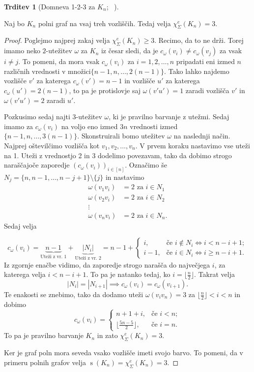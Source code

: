 \documentclass[12pt,a4paper,twoside]{article}
\theoremstyle{definition} %
\theoremstyle{plain} %
\newtheorem{trditev}[definicija]{Trditev}
\newcommand{\ec}{\chi_{\Sigma}^e}
\numberwithin{equation}{section}  %
\DeclareMathOperator{\s}{s}
\begin{document}
\begin{trditev}[Domneva 1-2-3 za $K_n$;~\citet{examples} ]
\end{trditev}
\label{res_complete}
Naj bo $K_n$ polni graf na vsaj treh vozliščih. Tedaj velja $\ec(K_n) = 3$.
	\begin{proof}


Poglejmo najprej zakaj velja $\ec(K_n) \ge 3$. Recimo, da to ne drži. Torej imamo neko $2$-utežitev $\omega$ za $K_n$ iz česar sledi, da je $c_{\omega}(v_i) \neq c_{\omega}(v_j)$ za vsak $ i \neq j$. To pomeni, da mora vsak $c_{\omega}(v_i)$ za $i=1,2,\ldots,n$ pripadati eni izmed $n$ različnih vrednosti v množici$\{n-1, n, \ldots, 2(n-1)\}$. Tako lahko najdemo vozlišče $v'$ za katerega $c_{\omega}(v') = n-1$ in vozlišče $u'$ za katerega $c_{\omega}(u') = 2(n-1)$, to pa je protislovje saj $\omega(v'u') = 1$ zaradi vozlišča $v'$ in $\omega(v'u') = 2$ zaradi $u'$.

 Pozkusimo sedaj najti $3$-utežitev $\omega$, ki je pravilno barvanje z utežmi. Sedaj imamo za $c_{\omega}(v_i)$ na voljo eno izmed $3n$ vrednosti izmed $\{n-1, n, \ldots, 3(n-1)\}$. Skonstruirali bomo utežitev $\omega$ na naslednji način. Najprej oštevilčimo vozlišča kot $v_1, v_2, \ldots, v_n$. V prvem koraku nastavimo vse uteži na 1. Uteži z vrednostjo 2 in 3 dodelimo povezavam, tako da dobimo strogo naraščajoče zaporedje $\left(c_{\omega}(v_i)\right)_{i \in [n]}$. Označimo še $N_j = \{n, n-1, \ldots, n - j + 1\} \setminus \{j\}$ in nastavimo
 \begin{equation*}
 \begin{split}
 \omega(v_1 v_i) &= 2 \text{ za } i \in N_1 \\
 \omega(v_2v_i) &=2 \text{ za } i \in N_2\\
 \vdots \\
 \omega(v_nv_i) &= 2 \text{ za } i \in N_n .
 \end{split}
 \end{equation*}
Sedaj velja 

$$ c_{\omega}(v_i) = \underbrace{n-1}_{\text{Uteži z vr. 1}} + \underbrace{|N_i|}_{\text{Uteži z vr. 2}}   = n-1 + 
\begin{cases}
 i, & \text{če } i\notin N_i \iff i < n - i +1; \\
  i - 1, & \text{če } i \in N_i \iff i \ge n - i + 1.
\end{cases} $$
Iz zgornje enačbe vidimo, da zaporedje strogo narašča do največjega $i$, za katerega velja $ i < n - i +1$. To pa je natanko tedaj, ko $ i =  \lfloor \frac{n}{2}\rfloor$. Takrat velja
$$|N_{i}|  =| N_{i+1}| \implies c_{\omega}(v_i) = c_{\omega}(v_{i+1}).$$
Te enakosti se znebimo, tako da dodamo uteži $\omega(v_iv_n) = 3$ za $\lfloor \frac{n}{2}\rfloor < i < n$ in dobimo
$$c_{\omega}(v_i) =
\begin{cases}
n + 1 + i, & \text{če } i < n; \\
\lfloor \frac{5n-5}{2}\rfloor, & \text{če }i=n.
\end{cases} 
 $$
 To pa je pravilno barvanje $K_n$ in zato $\ec(K_n) = 3$.

Ker je graf poln mora seveda vsako vozlišče imeti svojo barvo. To pomeni, da v primeru polnih grafov velja $\s(K_n) = \ec(K_n) = 3$.
\end{proof}
 
\end{document}
